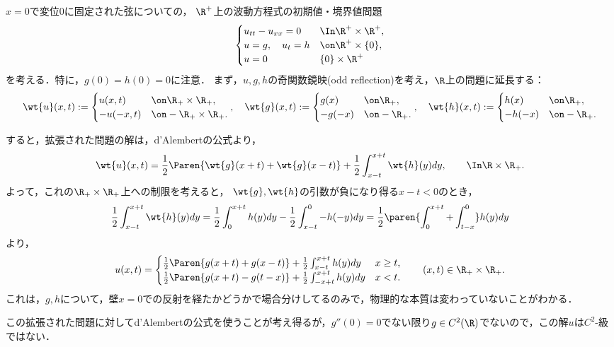\documentclass[uplatex,dvipdfmx]{jsreport}
\begin{document}
\begin{problem}[固定端波動の問題]
    $x=0$で変位$0$に固定された弦についての，
    $\R^+$上の波動方程式の初期値・境界値問題
    \[\begin{cases}
        u_{tt}-u_{xx}=0&\In\R^+\times\R^+,\\
        u=g,\quad u_t=h&\on\R^+\times\{0\},\\
        u=0&\{0\}\times\R^+
    \end{cases}\]
    を考える．特に，$g(0)=h(0)=0$に注意．
    まず，$u,g,h$の奇関数鏡映(odd reflection)を考え，$\R$上の問題に延長する：
    \[\wt{u}(x,t):=\begin{cases}
        u(x,t)&\on\R_+\times\R_+,\\
        -u(-x,t)&\on-\R_+\times\R_+.
    \end{cases},\quad\wt{g}(x,t):=\begin{cases}
        g(x)&\on\R_+,\\
        -g(-x)&\on-\R_+.
    \end{cases},\quad\wt{h}(x,t):=\begin{cases}
        h(x)&\on\R_+,\\
        -h(-x)&\on-\R_+.
    \end{cases}\]
\end{problem}
\begin{observation}\label{observation-fixed-edge-wave-equation}
    すると，拡張された問題の解は，d'Alembertの公式より，
    \[\wt{u}(x,t)=\frac{1}{2}\Paren{\wt{g}(x+t)+\wt{g}(x-t)}+\frac{1}{2}\int^{x+t}_{x-t}\wt{h}(y)dy,\qquad\In\R\times\R_+.\]
    よって，これの$\R_+\times\R_+$上への制限を考えると，
    $\wt{g},\wt{h}$の引数が負になり得る$x-t<0$のとき，
    \[\frac{1}{2}\int^{x+t}_{x-t}\wt{h}(y)dy=\frac{1}{2}\int^{x+t}_0h(y)dy-\frac{1}{2}\int^0_{x-t}-h(-y)dy=\frac{1}{2}\paren{\int^{x+t}_0+\int^0_{t-x}}h(y)dy\]
    より，
    \[u(x,t)=\begin{cases}
        \frac{1}{2}\Paren{g(x+t)+g(x-t)}+\frac{1}{2}\int^{x+t}_{x-t}h(y)dy&x\ge t,\\
        \frac{1}{2}\Paren{g(x+t)-g(t-x)}+\frac{1}{2}\int^{x+t}_{-x+t}h(y)dy&x<t.
    \end{cases}\qquad(x,t)\in\R_+\times\R_+.\]
    これは，$g,h$について，壁$x=0$での反射を経たかどうかで場合分けしてるのみで，物理的な本質は変わっていないことがわかる．
\end{observation}
\begin{remarks}
    この拡張された問題に対してd'Alembertの公式を使うことが考え得るが，$g''(0)=0$でない限り$g\in C^2(\R)$でないので，この解$u$は$C^2$-級ではない．
\end{remarks}
\end{document}
